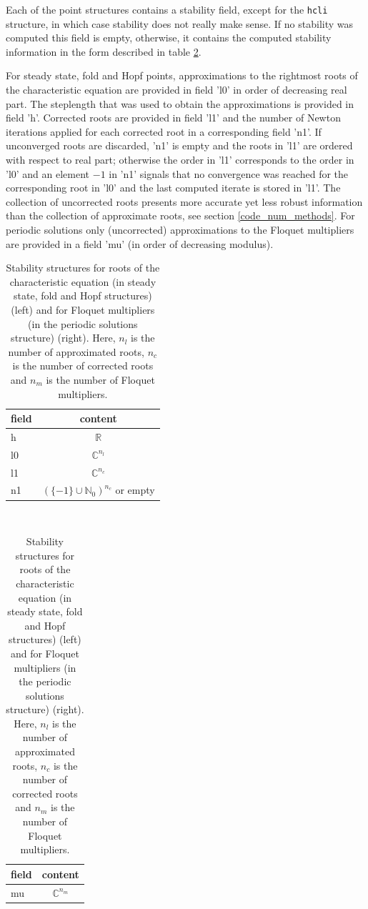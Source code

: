 \documentclass[10pt]{article}
\gdef \RR{{\mathbb R}}
\gdef \NN{{\mathbb N}}
\gdef \CC{{\mathbb C}}
\begin{document}
{Each of the point structures contains a stability
field, 
except for the \verb#hcli# structure, in which case 
stability does not really make
sense. 
If no stability was computed this field is empty,
otherwise, it contains the computed stability information in
the form described in table \ref{stab_structures}.

For steady state, fold and Hopf points, approximations to
the rightmost roots of the characteristic equation
are provided in field 'l0' in order of decreasing real part. 
The steplength that was used to obtain the approximations is
provided in field 'h'. Corrected roots are provided in field 'l1' and
the number of Newton iterations applied for each corrected
root in a corresponding field 'n1'. 
If unconverged roots are discarded, 'n1' is empty
and the roots in 'l1' are ordered with respect to real part; otherwise
the order in 'l1' corresponds to the order in 'l0' and 
an element $-1$ in 'n1' signals that no convergence was reached
for the corresponding root in 'l0' and the last computed iterate is
stored in 'l1'.
The collection of uncorrected roots presents more accurate yet less 
robust information than the collection of approximate roots,
see section \ref{code_num_methods}. For periodic solutions
only (uncorrected) approximations to the Floquet multipliers
are provided in a field 'mu' (in order of decreasing modulus).

\begin{table}[h]
\begin{center}
\begin{tabular}[t]{l|c}
field & content     \\\hline
h     & $\RR$       \\
l0    & $\CC^{n_l}$ \\
l1    & $\CC^{n_c}$ \\
n1    & $(\{-1\}\cup\NN_0)^{n_c}$ or empty
\end{tabular} \ \ \
\begin{tabular}[t]{l|c}
field & content     \\\hline
mu    & $\CC^{n_m}$ \\
\end{tabular}
\end{center}
\caption{\small\label{stab_structures}
Stability structures for roots of the characteristic equation
(in steady state, fold and Hopf structures) (left)
and for Floquet multipliers (in the periodic solutions structure) (right). 
Here, $n_l$ is the number of approximated roots,
$n_c$ is the number of corrected roots and $n_m$ is the number
of Floquet multipliers.}
\end{table}

}
\end{document}

